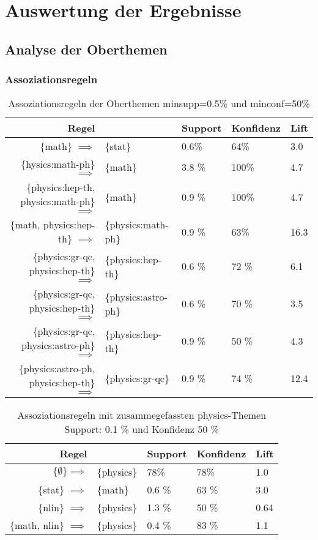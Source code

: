 \section{Auswertung der Ergebnisse}
\subsection{Analyse der Oberthemen}
\subsubsection{Assoziationsregeln}
\begin{table}[H]
\centering %
\begin{tabular}{| r l | l | l | l |}
		\hline
		\textbf{Regel}& &\textbf{Support} &\textbf{Konfidenz} & \textbf{Lift}\\
		\hline
		\{math\}  $\implies$ & \{stat\} & 0.6\% & 64\% &3.0  \\
		\{hysics:math-ph\} $\implies$& \{math\} &3.8 \% & 100\% & 4.7 \\
		\{physics:hep-th, physics:math-ph\}  $\implies$& \{math\} &0.9 \% &100\% &4.7 \\
		\{math, physics:hep-th\}  $\implies$& \{physics:math-ph\}  &0.9 \% &63\% &16.3 \\
		\{physics:gr-qc, physics:hep-th\} $\implies$& \{physics:hep-th\} &0.6 \% &72 \% &6.1 \\
		\{physics:gr-qc, physics:hep-th\} $\implies$& \{physics:astro-ph\} &0.6 \% &70 \% &3.5 \\
		\{physics:gr-qc, physics:astro-ph\} $\implies$& \{physics:hep-th\} &0.9 \% &50 \%  &4.3 \\
		\{physics:astro-ph, physics:hep-th\} $\implies$& \{physics:gr-qc\}  &0.9 \% &74 \% &12.4 \\
		\hline
\end{tabular}
\caption{Assoziationsregeln der Oberthemen minsupp=0.5\% und minconf=50\%}
\end{table}

\begin{table}[H]
\centering %
\begin{tabular}{|rl|l|l|l|}
	\hline
	\textbf{Regel}& &\textbf{Support} &\textbf{Konfidenz} & \textbf{Lift}\\
	\hline
	$\{\emptyset\} \implies$ & \{physics\} & 78\% &78\% &1.0  \\
	\{stat\} $\implies$ & \{math\}  &0.6 \% &63 \% &3.0 \\
	\{nlin\} $\implies$ & \{physics\}  &1.3 \% &50 \% &0.64 \\
	\{math, nlin\} $\implies$ & \{physics\}  &0.4 \% &83 \% &1.1 \\
	\hline
\end{tabular}
 \caption{Assoziationsregeln mit zusammegefassten physics-Themen Support: 0.1 \% und Konfidenz 50 \%}
\end{table}
